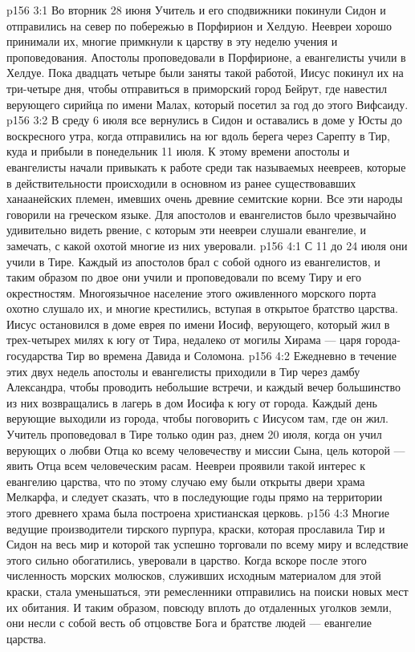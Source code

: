 \vs p156 3:1 Во вторник 28 июня Учитель и его сподвижники покинули Сидон и отправились на север по побережью в Порфирион и Хелдую. Неевреи хорошо принимали их, многие примкнули к царству в эту неделю учения и проповедования. Апостолы проповедовали в Порфирионе, а евангелисты учили в Хелдуе. Пока двадцать четыре были заняты такой работой, Иисус покинул их на три\hyp{}четыре дня, чтобы отправиться в приморский город Бейрут, где навестил верующего сирийца по имени Малах, который посетил за год до этого Вифсаиду.
\vs p156 3:2 В среду 6 июля все вернулись в Сидон и оставались в доме у Юсты до воскресного утра, когда отправились на юг вдоль берега через Сарепту в Тир, куда и прибыли в понедельник 11 июля. К этому времени апостолы и евангелисты начали привыкать к работе среди так называемых неевреев, которые в действительности происходили в основном из ранее существовавших ханаанейских племен, имевших очень древние семитские корни. Все эти народы говорили на греческом языке. Для апостолов и евангелистов было чрезвычайно удивительно видеть рвение, с которым эти неевреи слушали евангелие, и замечать, с какой охотой многие из них уверовали.
\vs p156 4:1 С 11 до 24 июля они учили в Тире. Каждый из апостолов брал с собой одного из евангелистов, и таким образом по двое они учили и проповедовали по всему Тиру и его окрестностям. Многоязычное население этого оживленного морского порта охотно слушало их, и многие крестились, вступая в открытое братство царства. Иисус остановился в доме еврея по имени Иосиф, верующего, который жил в трех\hyp{}четырех милях к югу от Тира, недалеко от могилы Хирама --- царя города\hyp{}государства Тир во времена Давида и Соломона.
\vs p156 4:2 Ежедневно в течение этих двух недель апостолы и евангелисты приходили в Тир через дамбу Александра, чтобы проводить небольшие встречи, и каждый вечер большинство из них возвращались в лагерь в дом Иосифа к югу от города. Каждый день верующие выходили из города, чтобы поговорить с Иисусом там, где он жил. Учитель проповедовал в Тире только один раз, днем 20 июля, когда он учил верующих о любви Отца ко всему человечеству и миссии Сына, цель которой --- явить Отца всем человеческим расам. Неевреи проявили такой интерес к евангелию царства, что по этому случаю ему были открыты двери храма Мелкарфа, и следует сказать, что в последующие годы прямо на территории этого древнего храма была построена христианская церковь.
\vs p156 4:3 Многие ведущие производители тирского пурпура, краски, которая прославила Тир и Сидон на весь мир и которой так успешно торговали по всему миру и вследствие этого сильно обогатились, уверовали в царство. Когда вскоре после этого численность морских молюсков, служивших исходным материалом для этой краски, стала уменьшаться, эти ремесленники отправились на поиски новых мест их обитания. И таким образом, повсюду вплоть до отдаленных уголков земли, они несли с собой весть об отцовстве Бога и братстве людей --- евангелие царства.
